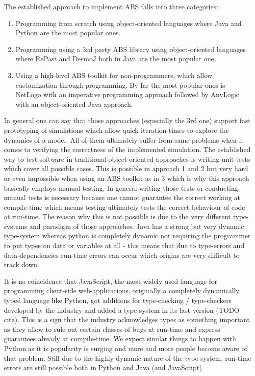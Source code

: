 The established approach to implement ABS falls into three categories:
\begin{enumerate}
	\item Programming from scratch using object-oriented languages where Java and Python are the most popular ones.
	\item Programming using a 3rd party ABS library using object-oriented languages where RePast and DesmoJ both in Java are the most popular one.
	\item Using a high-level ABS toolkit for non-programmers, which allow customization through programming. By far the most popular ones is NetLogo with an imperative programming approach followed by AnyLogic with an object-oriented Java approach.
\end{enumerate}

In general one can say that those approaches (especially the 3rd one) support fast prototyping of simulations which allow quick iteration times to explore the dynamics of a model. All of them ultimately suffer from same problems when it comes to verifying the correctness of the implemented simulation. The established way to test software in traditional object-oriented approaches is writing unit-tests which cover all possible cases. This is possible in approach 1 and 2 but very hard or even impossible when using an ABS toolkit as in 3 which is why this approach basically employs manual testing. In general writing those tests or conducting manual tests is necessary because one cannot guarantee the correct working at compile-time which means testing ultimately tests the correct behaviour of code at run-time. The reason why this is not possible is due to the very different type-systems and paradigm of those approaches. Java has a strong but very dynamic type-system whereas python is completely dynamic not requiring the programmer to put types on data or variables at all - this means that due to type-errors and data-dependencies run-time errors can occur which origins are very difficult to track down.

It is no coincidence that JavaScript, the most widely used language for programming client-side web-applications, originally a completely dynamically typed language like Python, got additions for type-checking / type-checkers developed by the industry and added a type-system in its last version (TODO cite). This is a sign that the industry acknowledges types as something important as they allow to rule out certain classes of bugs at run-time and express guarantees already at compile-time. We expect similar things to happen with Python as it is popularity is surging and more and more people become aware of that problem. Still due to the highly dynamic nature of the type-system, run-time errors are still possible both in Python and Java (and JavaScript). 

